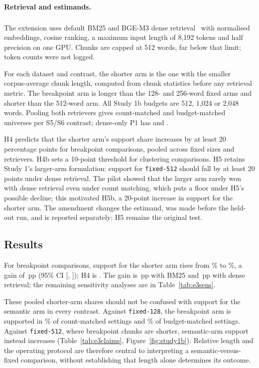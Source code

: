 \documentclass[11pt]{article}
\newcommand{\pp}{\ensuremath{\,\mathrm{pp}}}
\newcommand{\chunk}[1]{\texttt{#1}}
\newcommand{\citeL}[1]{\cite{#1}\textsuperscript{\textcolor{red}{\dag}}}
\begin{document}
\paragraph{Retrieval and estimands.}
The extension uses default BM25 and BGE-M3 dense retrieval~\citeL{chen2024bgem3} with normalised embeddings, cosine
ranking, a maximum input length of 8,192 tokens and half precision on one GPU. Chunks are capped at 512 words, far
below that limit; token counts were not logged.

For each dataset and contrast, the shorter arm is the one with the smaller corpus-average chunk length, computed from
chunk statistics before any retrieval metric. The breakpoint arm is longer than the 128- and 256-word fixed arms and
shorter than the 512-word arm. All Study 1b budgets are 512, 1,024 or 2,048 words. Pooling both retrievers gives
\SfiveUniversesCount{} count-matched and \SfiveUniversesBudget{} budget-matched universes per S5/S6 contrast;
dense-only P1 has \PoneDenseUniversesCount{} and \PoneDenseUniversesBudget.

H4 predicts that the shorter arm's support share increases by at least 20 percentage points for breakpoint
comparisons, pooled across fixed sizes and retrievers. H4b sets a 10-point threshold for clustering comparisons. H5
retains Study 1's larger-arm formulation: support for \chunk{fixed-512} should fall by at least 20 points under dense
retrieval. The pilot showed that the larger arm rarely won with dense retrieval even under count matching, which puts
a floor under H5's possible decline; this motivated H5b, a 20-point increase in support for the shorter arm. The
amendment changes the estimand, was made before the held-out run, and is reported separately; H5 remains the
original test.

\subsection{Results}
For breakpoint comparisons, support for the shorter arm rises from \HFourCount\% to \HFourBudget\%, a gain of
\HFourEst\pp{} (95\% CI [\HFourLo, \HFourHi]); H4 is \HFourVerdict. The gain is \HFourBmOnlyEst\pp{} with BM25 and
\HFourDenseOnlyEst\pp{} with dense retrieval; the remaining sensitivity analyses are in Table~\ref{tab:e3sens}.

These pooled shorter-arm shares should not be confused with support for the semantic arm in every contrast. Against
\chunk{fixed-128}, the breakpoint arm is supported in \SfiveOneTwoEightCountSem\% of count-matched settings and
\SfiveOneTwoEightBudgetSem\% of budget-matched settings. Against \chunk{fixed-512}, where breakpoint chunks are
shorter, semantic-arm support instead increases (Table~\ref{tab:e3claims}, Figure~\ref{fig:study1b}). Relative length
and the operating protocol are therefore central to interpreting a semantic-versus-fixed comparison, without
establishing that length alone determines its outcome.
\end{document}
